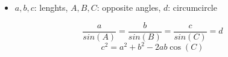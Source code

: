 \begin{itemize}
    \item $a, b, c$: lenghts, $A, B, C$: opposite angles, $d$: circumcircle
\end{itemize}
$$\frac{a}{sin(A)} = \frac{b}{sin(B)} = \frac{c}{sin(C)} = d$$
$$c^2 = a^2 + b^2 - 2ab\cos(C)$$
